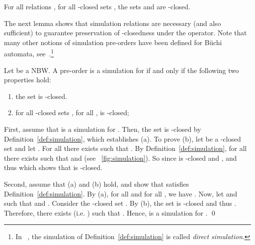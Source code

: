 \documentclass{LMCS}
\begin{document}
\begin{lem}\label{lem:closure-properties-a}
  For all relations , for all -closed sets ,
  the sets  and  are -closed.
\end{lem}
 
The next lemma shows that simulation relations are necessary (and also sufficient) to
guarantee preservation of -closedness under the  operator.
Note that many other notions of simulation pre-orders have been defined 
for B\"uchi automata, see~\cite{simulations}.\footnote{In ~\cite{simulations},
the simulation of Definition~\ref{def:simulation} is called \emph{direct simulation}.}


\begin{lem}\label{lem:closure-properties-b}
  Let  be a NBW.
  A pre-order  is a simulation for 
  if and only if the following two properties hold:
  \begin{enumerate}[\em(a)]
    \item the set  is -closed.
    \item for all -closed sets , for all ,  is -closed;
  \end{enumerate}
\end{lem}


\proof 
First, assume that  is a simulation for .
Then, the set  is -closed by Definition~\ref{def:simulation}, which establishes (a).
To prove (b), let  be a -closed set and let .
For all  there exists  such that 
. By Definition~\ref{def:simulation},
for all  there exists  such that 
 and  (see \figurename~\ref{fig:simulation}). 
So  since  is -closed and , and thus 
which shows that  is -closed. 

Second, assume that (a) and (b) hold, and show that  satisfies Definition~\ref{def:simulation}.
By (a), for all  and for all , we have .
Now, let  and  such that 
 and . Consider the 
-closed set .
By (b), the set  is -closed and thus
. Therefore, there exists  (i.e. 
) such that . 
Hence,  is a simulation for .
\qed
\end{document}
